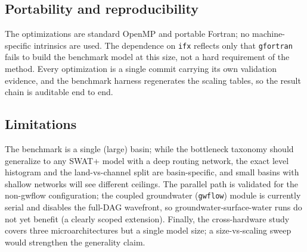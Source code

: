 \subsection{Portability and reproducibility}
The optimizations are standard OpenMP and portable Fortran; no machine-specific intrinsics are
used. The dependence on \texttt{ifx} reflects only that \texttt{gfortran} fails to build the
benchmark model at this size, not a hard requirement of the method. Every optimization is a
single commit carrying its own validation evidence, and the benchmark harness regenerates the
scaling tables, so the result chain is auditable end to end.

\subsection{Limitations}
The benchmark is a single (large) basin; while the bottleneck taxonomy should generalize to
any SWAT+ model with a deep routing network, the exact level histogram and the land-vs-channel
split are basin-specific, and small basins with shallow networks will see different ceilings.
The parallel path is validated for the non-gwflow configuration; the coupled groundwater
(\texttt{gwflow}) module is currently serial and disables the full-DAG wavefront, so
groundwater-surface-water runs do not yet benefit (a clearly scoped extension). Finally, the
cross-hardware study covers three microarchitectures but a single model size; a
size-vs-scaling sweep would strengthen the generality claim.
